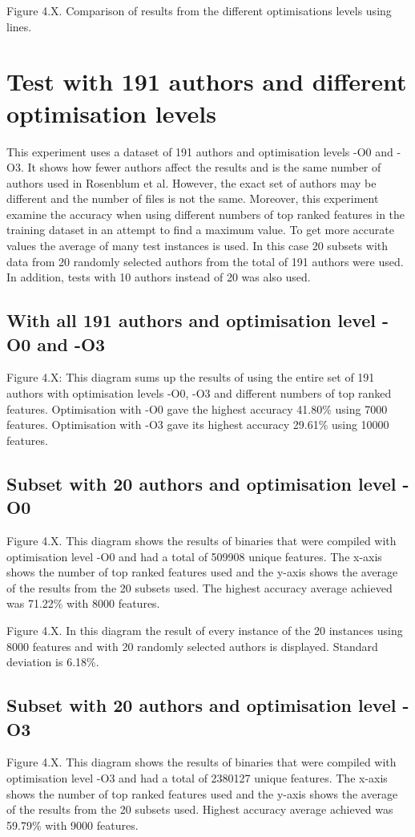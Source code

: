 \documentclass[a4paper,11pt]{kth-mag}
\begin{document}
Figure 4.X. Comparison of results from the different optimisations levels using
lines.  

\section{Test with 191 authors and different optimisation levels}
This experiment uses a dataset of 191 authors and optimisation levels -O0 and
-O3. It shows how fewer authors affect the results and is the same number of
authors used in Rosenblum et al. However, the exact set of authors may be
different and the number of files is not the same. Moreover, this experiment
examine the accuracy when using different numbers of top ranked features in the
training dataset in an attempt to find a maximum value. To get more accurate
values the average of many test instances is used. In this case 20 subsets with
data from 20 randomly selected authors from the total of 191 authors were used.
In addition, tests with 10 authors instead of 20 was also used.  

\subsection{With all 191 authors and optimisation level -O0 and -O3}
Figure 4.X: This diagram sums up the results of using the entire set of 191
authors with optimisation levels -O0, -O3 and different numbers of top ranked
features. Optimisation with -O0 gave the highest accuracy 41.80\% using 7000
features. Optimisation with -O3 gave its highest accuracy 29.61\% using 10000
features. 

\subsection{Subset with 20 authors and optimisation level -O0}
Figure 4.X. This diagram shows the results of binaries that were compiled with
optimisation level -O0 and had a total of 509908 unique features. The x-axis
shows the number of top ranked features used  and the y-axis shows the average
of the results from the 20 subsets used. The highest accuracy average achieved
was 71.22\% with 8000 features.

Figure 4.X.  In this diagram the result of every instance of the 20 instances
using 8000 features and with 20 randomly selected authors is displayed.
Standard deviation is 6.18\%.

\subsection{Subset with 20 authors and optimisation level -O3}
Figure 4.X. This diagram shows the results of binaries that were compiled with
optimisation level -O3 and had a total of 2380127 unique features. The x-axis
shows the number of top ranked features used and the y-axis shows the average
of the results from the 20 subsets used. Highest accuracy average achieved was
59.79\% with 9000 features.
\end{document}

